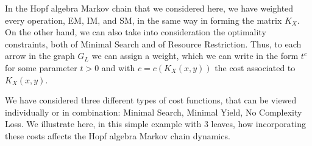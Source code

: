 \documentclass[12pt]{amsart}
\numberwithin{equation}{section}
\begin{document}
In the Hopf algebra Markov chain that we considered here, we have weighted every
operation, EM, IM, and SM, in the same way in forming the matrix $K_X$. On the
other hand, we can also take into consideration the optimality constraints, both of
Minimal Search and of Resource Restriction. Thus, to each arrow in the graph $G_L$
we can assign a weight, which we can write in the form $t^c$ for some
parameter $t >0$ and with $c=c(K_X(x,y))$ the cost associated to $K_X(x,y)$.

\smallskip

We have considered three different types of cost functions, that can be viewed
individually or in combination: Minimal Search, Minimal Yield, No Complexity Loss.
We illustrate here, in this simple example with $3$ leaves, how incorporating
these costs affects the Hopf algebra Markov chain dynamics. 

\smallskip
\end{document}

